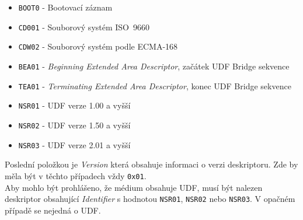\begin{itemize}
    \item \texttt{BOOT0} - Bootovací záznam
    \item \texttt{CD001} - Souborový systém ISO~9660
    \item \texttt{CDW02} - Souborový systém podle ECMA-168 \cite{ecma-168}
    \item \texttt{BEA01} - \textit{Beginning Extended Area Descriptor}, začátek UDF Bridge sekvence
    \item \texttt{TEA01} - \textit{Terminating Extended Area Descriptor}, konec UDF Bridge sekvence
    \item \texttt{NSR01} - UDF verze 1.00 a vyšší
    \item \texttt{NSR02} - UDF verze 1.50 a vyšší
    \item \texttt{NSR03} - UDF verze 2.01 a vyšší
\end{itemize}
Poslední položkou je \textit{Version} která obsahuje informaci o verzi deskriptoru. Zde by měla být v těchto případech vždy \texttt{0x01}.\\
Aby mohlo být prohlášeno, že médium obsahuje UDF, musí být nalezen deskriptor obsahující \textit{Identifier} s hodnotou \texttt{NSR01}, \texttt{NSR02} nebo \texttt{NSR03}. V opačném případě se nejedná o UDF.

